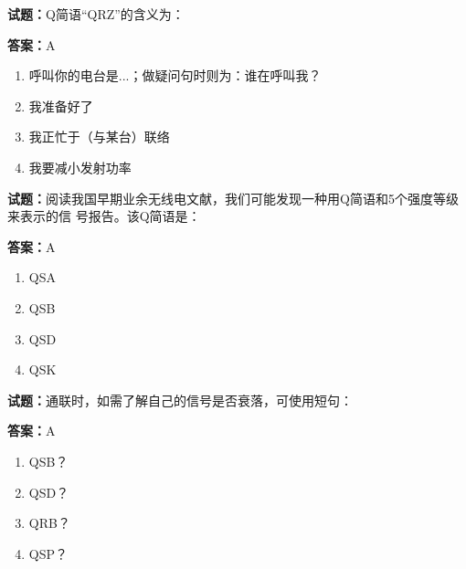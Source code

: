 \documentclass{ctexbook}
\begin{document}




\vspace{1em}

\textbf{试题：}Q简语“QRZ”的含义为： 

\textbf{答案：}A 

\begin{enumerate}[leftmargin=3em]
  \item 呼叫你的电台是...；做疑问句时则为：谁在呼叫我？ 

  \item 我准备好了 

  \item 我正忙于（与某台）联络 

  \item 我要减小发射功率 

\end{enumerate}





\vspace{1em}

\textbf{试题：}阅读我国早期业余无线电文献，我们可能发现一种用Q简语和5个强度等级来表示的信
号报告。该Q简语是： 

\textbf{答案：}A 

\begin{enumerate}[leftmargin=3em]
  \item QSA 

  \item QSB 

  \item QSD 

  \item QSK 

\end{enumerate}






\vspace{1em}

\textbf{试题：}通联时，如需了解自己的信号是否衰落，可使用短句： 

\textbf{答案：}A 

\begin{enumerate}[leftmargin=3em]
  \item QSB？ 

  \item QSD？ 

  \item QRB？ 

  \item QSP？ 

\end{enumerate}
\end{document}
